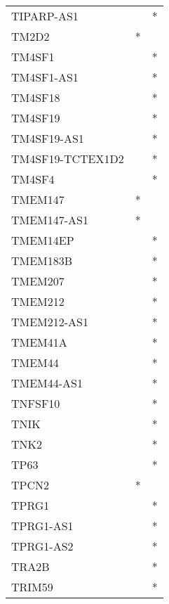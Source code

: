 \begin{longtable}{lcc}
TIPARP-AS1       &                &          * \\
TM2D2            &              * &            \\
TM4SF1           &                &          * \\
TM4SF1-AS1       &                &          * \\
TM4SF18          &                &          * \\
TM4SF19          &                &          * \\
TM4SF19-AS1      &                &          * \\
TM4SF19-TCTEX1D2 &                &          * \\
TM4SF4           &                &          * \\
TMEM147          &              * &            \\
TMEM147-AS1      &              * &            \\
TMEM14EP         &                &          * \\
TMEM183B         &                &          * \\
TMEM207          &                &          * \\
TMEM212          &                &          * \\
TMEM212-AS1      &                &          * \\
TMEM41A          &                &          * \\
TMEM44           &                &          * \\
TMEM44-AS1       &                &          * \\
TNFSF10          &                &          * \\
TNIK             &                &          * \\
TNK2             &                &          * \\
TP63             &                &          * \\
TPCN2            &              * &            \\
TPRG1            &                &          * \\
TPRG1-AS1        &                &          * \\
TPRG1-AS2        &                &          * \\
TRA2B            &                &          * \\
TRIM59           &                &          * \\

\end{longtable}
